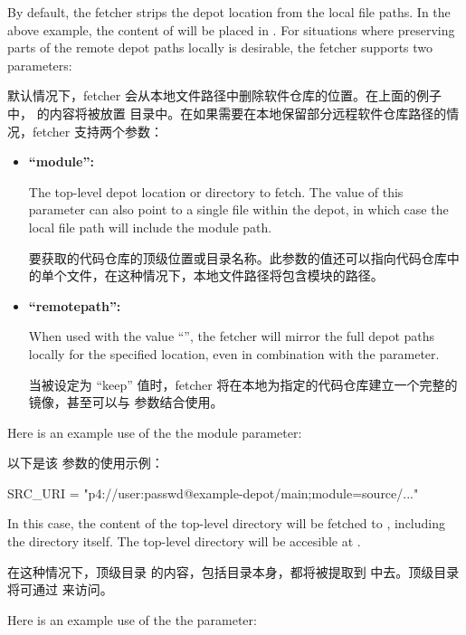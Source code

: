 By default, the fetcher strips the depot location from the local file paths. In the above example, the content of  will be placed in . For situations where preserving parts of the remote depot paths locally is desirable, the fetcher supports two parameters:

默认情况下，fetcher 会从本地文件路径中删除软件仓库的位置。在上面的例子中， 的内容将被放置  目录中。在如果需要在本地保留部分远程软件仓库路径的情况，fetcher 支持两个参数：

\begin{itemize}
\setlength\itemsep{1.0em}
\item \textbf{``module'':}\par
The top-level depot location or directory to fetch. The value of this parameter can also point to a single file within the depot, in which case the local file path will include the module path.

\medskip
要获取的代码仓库的顶级位置或目录名称。此参数的值还可以指向代码仓库中的单个文件，在这种情况下，本地文件路径将包含模块的路径。

\item \textbf{``remotepath'':}\par
When used with the value ``'', the fetcher will mirror the full depot paths locally for the specified location, even in combination with the  parameter.

\medskip
当被设定为 ``keep'' 值时，fetcher 将在本地为指定的代码仓库建立一个完整的镜像，甚至可以与  参数结合使用。
\end{itemize}

Here is an example use of the the module parameter:

以下是该  参数的使用示例：

\begin{pyglist}
SRC_URI = "p4://user:passwd@example-depot/main;module=source/..."
\end{pyglist}

In this case, the content of the top-level directory  will be fetched to , including the directory itself. The top-level directory will be accesible at .

在这种情况下，顶级目录  的内容，包括目录本身，都将被提取到  中去。顶级目录将可通过  来访问。

Here is an example use of the the  parameter:

